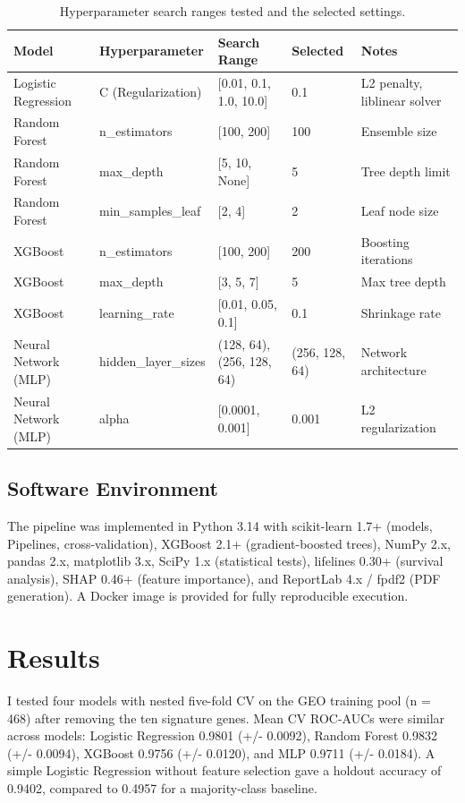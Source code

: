 \documentclass[12pt]{article}
\begin{document}
\begin{table}[H]
\centering
\caption{Hyperparameter search ranges tested and the selected settings.}
\begin{tabular}{lllll}
\toprule
Model & Hyperparameter & Search Range & Selected & Notes \\
\midrule
Logistic Regression & C (Regularization) & {[}0.01, 0.1, 1.0, 10.0{]} & 0.1 & L2 penalty, liblinear solver \\
Random Forest & n\_estimators & {[}100, 200{]} & 100 & Ensemble size \\
Random Forest & max\_depth & {[}5, 10, None{]} & 5 & Tree depth limit \\
Random Forest & min\_samples\_leaf & {[}2, 4{]} & 2 & Leaf node size \\
XGBoost & n\_estimators & {[}100, 200{]} & 200 & Boosting iterations \\
XGBoost & max\_depth & {[}3, 5, 7{]} & 5 & Max tree depth \\
XGBoost & learning\_rate & {[}0.01, 0.05, 0.1{]} & 0.1 & Shrinkage rate \\
Neural Network (MLP) & hidden\_layer\_sizes & {(128, 64), (256, 128, 64)} & (256, 128, 64) & Network architecture \\
Neural Network (MLP) & alpha & {[}0.0001, 0.001{]} & 0.001 & L2 regularization \\
\bottomrule
\end{tabular}
\end{table}

\subsection{Software Environment}

The pipeline was implemented in Python 3.14 with scikit-learn 1.7+ (models, Pipelines, cross-validation), XGBoost 2.1+ (gradient-boosted trees), NumPy 2.x, pandas 2.x, matplotlib 3.x, SciPy 1.x (statistical tests), lifelines 0.30+ (survival analysis), SHAP 0.46+ (feature importance), and ReportLab 4.x / fpdf2 (PDF generation). A Docker image is provided for fully reproducible execution.

\section{Results}

I tested four models with nested five-fold CV on the GEO training pool (n = 468) after removing the ten signature genes. Mean CV ROC-AUCs were similar across models: Logistic Regression 0.9801 (+/- 0.0092), Random Forest 0.9832 (+/- 0.0094), XGBoost 0.9756 (+/- 0.0120), and MLP 0.9711 (+/- 0.0184). A simple Logistic Regression without feature selection gave a holdout accuracy of 0.9402, compared to 0.4957 for a majority-class baseline.
\end{document}
